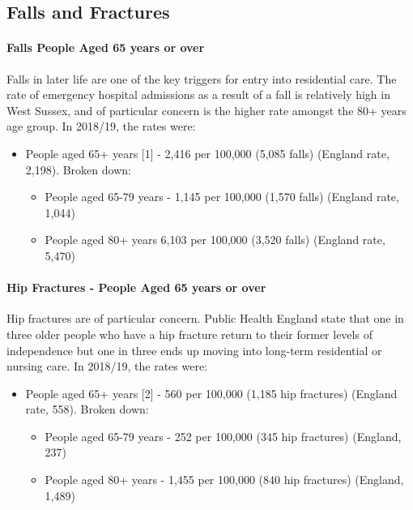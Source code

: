 \subsection{Falls and Fractures}
\paragraph{Falls People Aged 65 years or over} Falls in later life are one of the key triggers for entry into residential care. The rate of emergency hospital admissions as a result of a fall is relatively high in West Sussex, and of particular concern is the higher rate amongst the 80+ years age group. In 2018/19, the rates were:

\begin{itemize}[noitemsep]
    \item People aged 65+ years [1] - 2,416 per 100,000 (5,085 falls) (England rate, 2,198). Broken down:
    \begin{itemize}[noitemsep]
        \item People aged 65-79 years - 1,145 per 100,000 (1,570 falls) (England rate, 1,044)
        \item People aged 80+ years 6,103 per 100,000 (3,520 falls) (England rate, 5,470)
    \end{itemize}
\end{itemize}

\paragraph{Hip Fractures - People Aged 65 years or over} Hip fractures are of particular concern. Public Health England state that one in three older people who have a hip fracture return to their former levels of independence but one in three ends up moving into long-term residential or nursing care. In 2018/19, the rates were:


\begin{itemize}[noitemsep]
    \item People aged 65+ years [2] - 560 per 100,000 (1,185 hip fractures) (England rate, 558). Broken down:
    \begin{itemize}[noitemsep]
        \item People aged 65-79 years - 252 per 100,000 (345 hip fractures) (England, 237)
        \item People aged 80+ years - 1,455 per 100,000 (840 hip fractures) (England, 1,489)
    \end{itemize}
\end{itemize}

